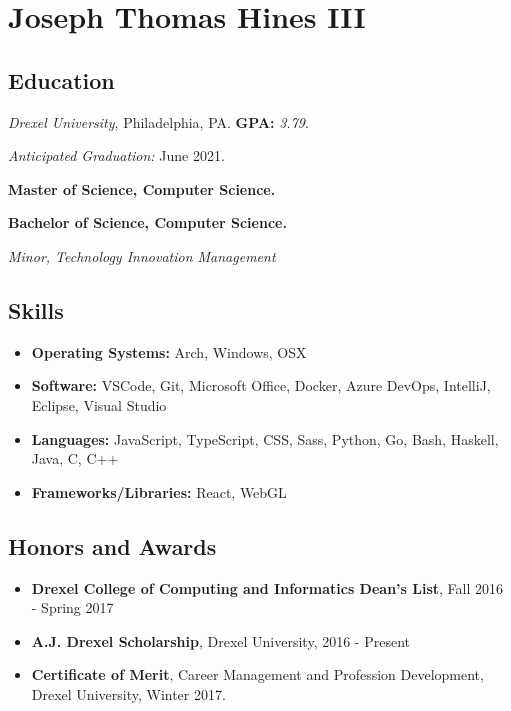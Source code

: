 \documentclass[10pt]{article}
\begin{document}
\section*{\huge Joseph Thomas Hines III}
\label{sec:title}

\begin{multicols}{2}
\subsection*{Education}%
\label{sub:Education}

\emph{Drexel University}, Philadelphia, PA. \textbf{GPA:} \emph{3.79}.

\emph{Anticipated Graduation:} June 2021.

\null

\textbf{Master of Science, Computer Science.}

\textbf{Bachelor of Science, Computer Science.}

\emph{Minor, Technology Innovation Management}

\subsection*{Skills}%
\label{sub:Skills}

\begin{itemize}
\setlength\itemsep{0.5em}
\item \textbf{Operating Systems:} Arch, Windows, OSX
\item \textbf{Software:} VSCode, Git, Microsoft Office, Docker, Azure DevOps,
	IntelliJ, Eclipse, Visual Studio
\item \textbf{Languages:} JavaScript, TypeScript, CSS, Sass, Python, Go,
	Bash, Haskell, Java, C, C++
\item \textbf{Frameworks/Libraries:} React, WebGL
\end{itemize}

\subsection*{Honors and Awards}%
\label{sub:Honors and Awards}

\begin{itemize}
\setlength\itemsep{0.5em}
\item \textbf{Drexel College of Computing and Informatics Dean's List},
	Fall 2016 - Spring 2017
\item \textbf{A.J. Drexel Scholarship}, Drexel University, 2016 - Present
\item \textbf{Certificate of Merit}, Career Management and Profession Development, Drexel University, Winter 2017.
\end{itemize}


\end{multicols}
\end{document}
